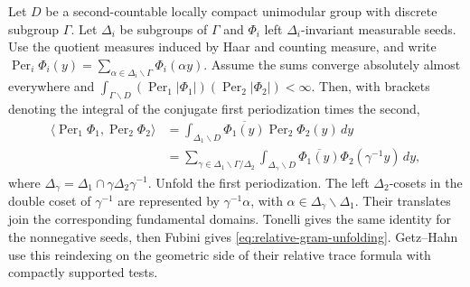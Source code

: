 \leavevmode{}%
Let \(D\) be a second-countable locally compact unimodular group
with discrete subgroup \(\Gamma\). Let \(\Delta_i\) be subgroups of
\(\Gamma\) and \(\Phi_i\) left \(\Delta_i\)-invariant measurable seeds.
Use the quotient measures induced by Haar and counting measure, and
write \(\operatorname{Per}_i\Phi_i(y)=
\sum_{\alpha\in\Delta_i\backslash\Gamma}\Phi_i(\alpha y)\).
Assume the sums converge absolutely almost everywhere and
\(\int_{\Gamma\backslash D}(\operatorname{Per}_1|\Phi_1|)
(\operatorname{Per}_2|\Phi_2|)<\infty\). Then, with brackets denoting
the integral of the conjugate first periodization times the second,
\begin{equation}
 \label{eq:relative-gram-unfolding}
 \begin{aligned}
  \big\langle\operatorname{Per}_1\Phi_1,\operatorname{Per}_2\Phi_2\big\rangle
   &=\int_{\Delta_1\backslash D}\overline{\Phi_1(y)}
                        \operatorname{Per}_2\Phi_2(y)\,dy\\
   &=\sum_{\gamma\in\Delta_1\backslash\Gamma/\Delta_2}
        \int_{\Delta_\gamma\backslash D}
                 \overline{\Phi_1(y)}\Phi_2(\gamma^{-1}y)\,dy ,
 \end{aligned}
\end{equation}
where \(\Delta_\gamma=\Delta_1\cap\gamma\Delta_2\gamma^{-1}\).
Unfold the first periodization. The left \(\Delta_2\)-cosets in
the double coset of \(\gamma^{-1}\) are represented by
\(\gamma^{-1}\alpha\), with
\(\alpha\in\Delta_\gamma\backslash\Delta_1\). Their translates join
the corresponding fundamental domains. Tonelli gives the same
identity for the nonnegative seeds, then Fubini gives
\eqref{eq:relative-gram-unfolding}.
Getz--Hahn use this reindexing on the geometric side of their
relative trace formula with compactly supported tests.
\cite[\S4C, (4C.8) and its unfolding, p.~114]{tr3getzhahn}

